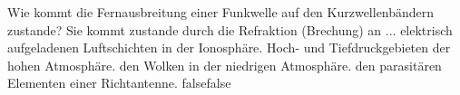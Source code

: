     {Wie kommt die Fernausbreitung einer Funkwelle auf den Kurzwellenbändern zustande? Sie kommt zustande durch die Refraktion (Brechung) an ...}
    {elektrisch aufgeladenen Luftschichten in der Ionosphäre.}
    {Hoch- und Tiefdruckgebieten der hohen Atmosphäre.}
    {den Wolken in der niedrigen Atmosphäre.}
    {den parasitären Elementen einer Richtantenne.}
    {false}{false}